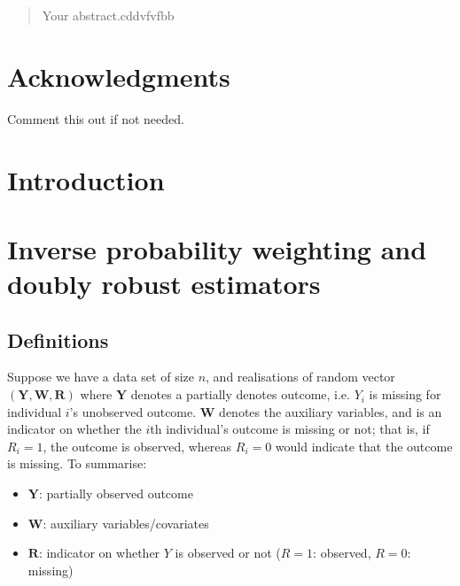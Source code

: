 \documentclass[12pt,twoside]{article}
\date{October 2020}
\begin{document}



\clearpage{\pagestyle{empty}\cleardoublepage}
\setcounter{page}{1}
\pagestyle{fancy}
\setlength{\parindent}{5ex}
\begin{abstract}
Your abstract.cddvfvfbb


\end{abstract}

\cleardoublepage
\section*{Acknowledgments}
Comment this out if not needed.

\clearpage{\pagestyle{empty}\cleardoublepage}

\tableofcontents 


\clearpage{\pagestyle{empty}\cleardoublepage}
\setcounter{page}{1}
\fancyhead[L]{\textsl{\leftmark}}


\section{Introduction} 


\section{Inverse probability weighting and doubly robust estimators}

\subsection{Definitions} 

Suppose we have a data set of size $n$, and realisations of random vector $(\mathbf{Y}, \mathbf{W}, \mathbf{R})$ where $\mathbf{Y}$ denotes a partially denotes outcome, i.e. $Y_i$ is missing for individual $i$'s unobserved outcome. $\mathbf{W}$ denotes the auxiliary variables, and  is an indicator on whether the $i$th individual's outcome is missing or not; that is, if $R_i = 1$, the outcome is observed, whereas $R_i = 0$ would indicate that the outcome is missing.
To summarise:
\begin{itemize}
    \item $\mathbf{Y}$: partially observed outcome 
    \item $\mathbf{W}$: auxiliary variables/covariates 
    \item $\mathbf{R}$: indicator on whether $Y$ is observed or not ($R = 1$: observed, $R = 0$: missing) 
\end{itemize}
\end{document}
